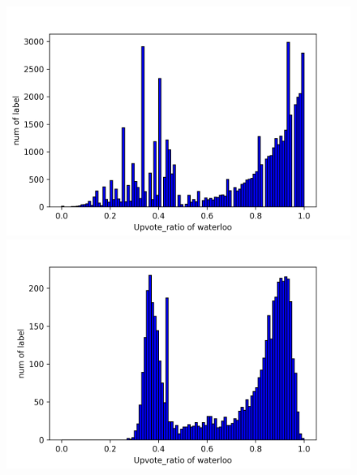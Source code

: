 \documentclass[11pt,a4paper]{article}
\begin{document}
    \begin{figure}
        \begin{minipage}{0.5\textwidth}
            \includegraphics[width=\textwidth]{uwaterloo_task2true_nonsmooth.png}
        \end{minipage}
        \begin{minipage}{0.5\textwidth}
            \includegraphics[width=\textwidth]{uwaterloo_task2pred_nonsmooth.png}
        \end{minipage}


\end{figure}
\end{document}
